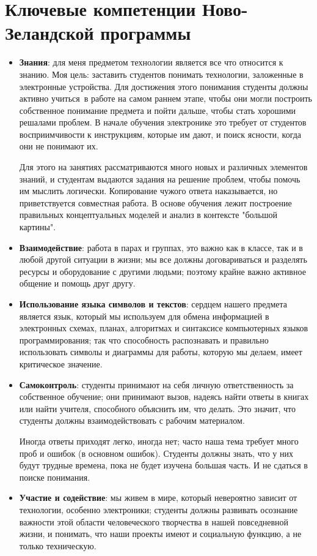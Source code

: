 \section{Ключевые компетенции Ново-Зеландской программы}

\begin{itemize}

\item\textbf{Знания}: для меня предметом технологии является все что относится к
знанию. Моя цель: заставить студентов понимать технологии, заложенные в
электронные устройства. Для достижения этого понимания студенты должны активно
учиться\
в работе на самом раннем этапе, чтобы они могли построить собственное понимание
предмета и пойти дальше, чтобы стать хорошими решалами проблем. В начале
обучения электронике это требует от студентов восприимчивости к инструкциям,
которые им дают, и поиск ясности, когда они не понимают их.

Для этого на занятиях рассматриваются много новых и различных элементов знаний,
и студентам выдаются задания на решение проблем, чтобы помочь им мыслить
логически. Копирование чужого ответа наказывается, но приветствуется совместная
работа. В основе обучения лежит построение правильных концептуальных моделей и
анализ в контексте "большой картины".

\item\textbf{Взаимодействие}: работа в парах и группах, это важно как в классе,
так и в любой другой ситуации в жизни; мы все должны договариваться и разделять
ресурсы и оборудование с другими людьми; поэтому крайне важно активное общение и
помощь друг другу.

\item\textbf{Использование языка символов и текстов}: сердцем нашего предмета
является язык, который мы используем для обмена информацией в электронных
схемах, планах, алгоритмах и синтаксисе компьютерных языков программирования;
так что способность распознавать и правильно использовать символы и диаграммы для
работы, которую мы делаем, имеет критическое значение.

\item\textbf{Самоконтроль}: студенты принимают на себя личную ответственность за
собственное обучение; они принимают вызов, надеясь найти ответы в книгах или
найти учителя, способного объяснить им, что делать. Это значит, что студенты
должны взаимодействовать с рабочим материалом. 

Иногда ответы приходят легко, иногда нет; часто наша тема требует много проб и
ошибок (в основном ошибок). Студенты должны знать, что у них будут трудные
времена, пока не будет изучена большая часть. И не сдаться в поиске понимания.

\item\textbf{Участие и содействие}: мы живем в мире, который невероятно зависит
от технологии, особенно электроники; студенты должны развивать осознание
важности этой области человеческого творчества в нашей повседневной жизни, и
понимать, что наши проекты имеют и социальную функцию, а не только техническую.

\end{itemize}
